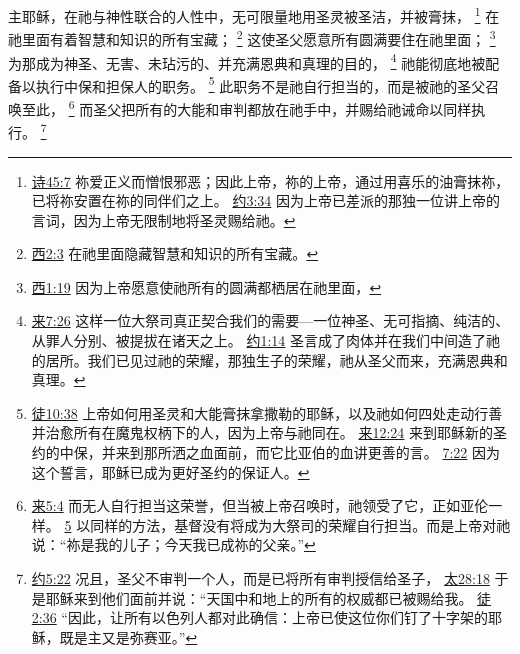 \documentclass[12pt, a4paper, oneside]{ctexart}
\newcounter{parnum}[section]
\newcommand{\N}{%
   \noindent\refstepcounter{parnum}%
    \makebox[\parindent][l]{\textbf{\arabic{parnum}.}}}
\begin{document}
\N 主耶稣，在祂与神性联合的人性中，无可限量地用圣灵被圣洁，并被膏抹，
	\footnote {
		\href{https://biblehub.com/psalms/45-7.htm}{诗45:7} 祢爱正义而憎恨邪恶；因此上帝，祢的上帝，通过用喜乐的油膏抹祢，已将祢安置在祢的同伴们之上。
		\href{https://biblehub.com/john/3-34.htm}{约3:34} 因为上帝已差派的那独一位讲上帝的言词，因为上帝无限制地将圣灵赐给祂。
	}
	在祂里面有着智慧和知识的所有宝藏；
	\footnote {
		\href{https://biblehub.com/colossians/2-3.htm}{西2:3} 在祂里面隐藏智慧和知识的所有宝藏。
	}
	这使圣父愿意所有圆满要住在祂里面；
	\footnote {
		\href{https://biblehub.com/colossians/1-19.htm}{西1:19} 因为上帝愿意使祂所有的圆满都栖居在祂里面，
	}
	为那成为神圣、无害、未玷污的、并充满恩典和真理的目的，
	\footnote {
		\href{https://biblehub.com/hebrews/7-26.htm}{来7:26} 这样一位大祭司真正契合我们的需要---一位神圣、无可指摘、纯洁的、从罪人分别、被提拔在诸天之上。
		\href{https://biblehub.com/john/1-14.htm}{约1:14} 圣言成了肉体并在我们中间造了祂的居所。我们已见过祂的荣耀，那独生子的荣耀，祂从圣父而来，充满恩典和真理。
	}
	祂能彻底地被配备以执行中保和担保人的职务。
	\footnote {
		\href{https://biblehub.com/acts/10-38.htm}{徒10:38} 上帝如何用圣灵和大能膏抹拿撒勒的耶稣，以及祂如何四处走动行善并治愈所有在魔鬼权柄下的人，因为上帝与祂同在。
		\href{https://biblehub.com/hebrews/12-24.htm}{来12:24} 来到耶稣新的圣约的中保，并来到那所洒之血面前，而它比亚伯的血讲更善的言。
		\href{https://biblehub.com/hebrews/7-22.htm}{7:22} 因为这个誓言，耶稣已成为更好圣约的保证人。
	}
	此职务不是祂自行担当的，而是被祂的圣父召唤至此，
	\footnote {
		\href{https://biblehub.com/hebrews/5-4.htm}{来5:4} 而无人自行担当这荣誉，但当被上帝召唤时，祂领受了它，正如亚伦一样。
		\href{https://biblehub.com/hebrews/5-5.htm}{5} 以同样的方法，基督没有将成为大祭司的荣耀自行担当。而是上帝对祂说：“祢是我的儿子；今天我已成祢的父亲。”
	}
	而圣父把所有的大能和审判都放在祂手中，并赐给祂诫命以同样执行。
	\footnote {
		\href{https://biblehub.com/john/5-22.htm}{约5:22} 况且，圣父不审判一个人，而是已将所有审判授信给圣子，
		\href{https://biblehub.com/matthew/28-18.htm}{太28:18} 于是耶稣来到他们面前并说：“天国中和地上的所有的权威都已被赐给我。
		\href{https://biblehub.com/acts/2-36.htm}{徒2:36} “因此，让所有以色列人都对此确信：上帝已使这位你们钉了十字架的耶稣，既是主又是弥赛亚。”
	}
\end{document}
